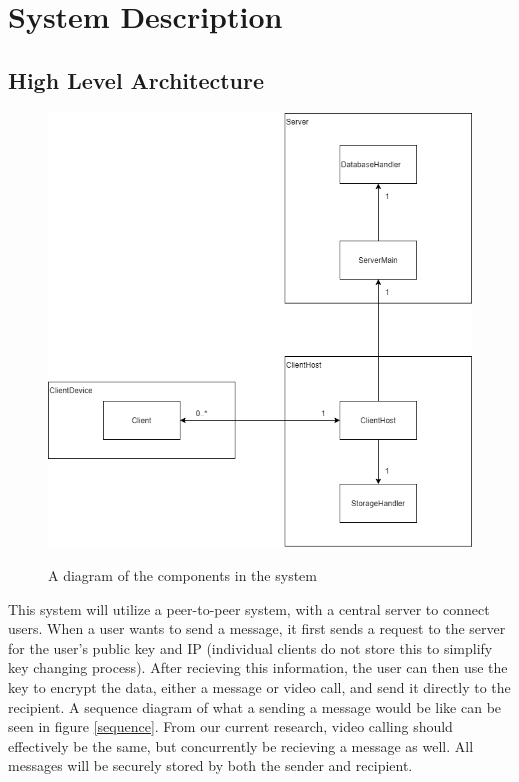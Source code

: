 \documentclass[titlepage]{article}
\begin{document}
    \section{System Description}

    \subsection{High Level Architecture}

    \begin{center}
        \begin{figure}[!ht]
            \includegraphics[scale=.5]{graphics/arch.png}
            \label{componenets}
            \caption{A diagram of the components in the system}
        \end{figure}
    \end{center}

    This system will utilize a peer-to-peer system, with a central server to connect users.
    When a user wants to send a message, it first sends a request to the server for the user's public key and IP (individual clients do not store this to simplify key changing process).
    After recieving this information, the user can then use the key to encrypt the data, either a message or video call, and send it directly to the recipient.
    A sequence diagram of what a sending a message would be like can be seen in figure \ref{sequence}.
    From our current research, video calling should effectively be the same, but concurrently be recieving a message as well.
    All messages will be securely stored by both the sender and recipient.
\end{document}
